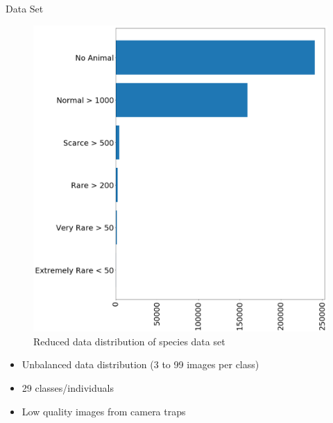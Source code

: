 \documentclass[10pt]{beamer}
\begin{document}
\begin{frame}{Data Set}
	\begin{minipage}[c]{0.48\linewidth}
		\centering
		\begin{figure}
			\includegraphics[width=\linewidth,height=.8\textheight,keepaspectratio]{images/Data_dist_sorted_reduced_v2.png}
			\caption{Reduced data distribution of species data set}
		\end{figure}
	\end{minipage}
	\hfill
	\begin{minipage}[c]{0.48\linewidth}
	\begin{itemize}
		\item Unbalanced data distribution (3 to 99 images per class)
		\item 29 classes/individuals
		\item Low quality images from camera traps
	\end{itemize}

	\end{minipage}
\end{frame}

\end{document}
